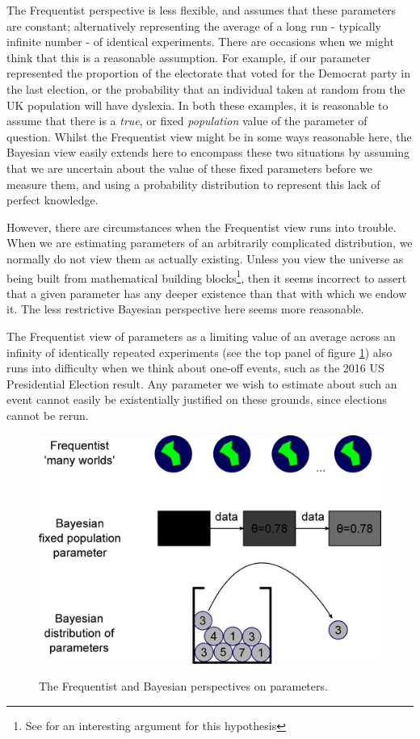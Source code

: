 \documentclass[11pt,fullpage]{book}
\begin{document}
The Frequentist perspective is less flexible, and assumes that these parameters are constant; alternatively representing the average of a long run - typically infinite number - of identical experiments. There are occasions when we might think that this is a reasonable assumption. For example, if our parameter represented the proportion of the electorate that voted for the Democrat party in the last election, or the probability that an individual taken at random from the UK population will have dyslexia. In both these examples, it is reasonable to assume that there is a \textit{true}, or fixed \textit{population} value of the parameter of question. Whilst the Frequentist view might be in some ways reasonable here, the Bayesian view easily extends here to encompass these two situations by assuming that we are uncertain about the value of these fixed parameters before we measure them, and using a probability distribution to represent this lack of perfect knowledge. 

However, there are circumstances when the Frequentist view runs into trouble. When we are estimating parameters of an arbitrarily complicated distribution, we normally do not view them as actually existing. Unless you view the universe as being built from mathematical building blocks\footnote{See \cite{tegmark2014our} for an interesting argument for this hypothesis}, then it seems incorrect to assert that a given parameter has any deeper existence than that with which we endow it. The less restrictive Bayesian perspective here seems more reasonable.

The Frequentist view of parameters as a limiting value of an average across an infinity of identically repeated experiments (see the top panel of figure \ref{fig:Posterior_manyWorldsDoParametersExist}) also runs into difficulty when we think about one-off events, such as the 2016 US Presidential Election result. Any parameter we wish to estimate about such an event cannot easily be existentially justified on these grounds, since elections cannot be rerun.


\begin{figure}
\centering
\scalebox{0.2} 
{\includegraphics{Posterior_manyWorldsDoParametersExist.eps}}
\caption{The Frequentist and Bayesian perspectives on parameters.}\label{fig:Posterior_manyWorldsDoParametersExist}
\end{figure}
\end{document}
